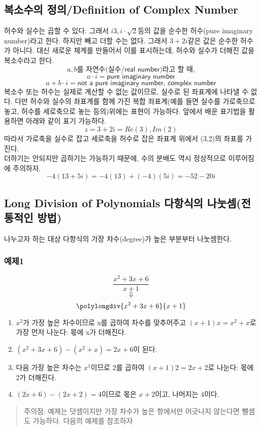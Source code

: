 \documentclass{article}
\begin{document}
\subsection{복소수의 정의/Definition of Complex Number}
허수와 실수는 곱할 수 있다. 그래서 $i3, i\cdot \sqrt{2}$등의 값을 순수한 허수(pure imaginary number)라고 한다. 하지만 빼고 더할 수는 없다. 그래서 $3+2i$같은 값은 순수한 허수가 아니다. 대신 새로운 체계를 만들어서 이를 표시하는데, 허수와 실수가 더해진 값을 복소수라고 한다.
$$a,b{\textsf{를 자연수(실수/real number)라고 할 때,}}$$
$$a\cdot i = {\textsf{pure imaginary number}}$$
$$a+b\cdot i = {\textsf{not a pure imaginary number, complex number}}$$
복소수 또는 허수는 실제로 계산할 수 없는 값이므로, 실수로 된 좌표계에 나타낼 수 없다. 다만 허수와 실수의 좌표계를 함께 가진 복합 좌표계(예를 들면 실수를 가로축으로 놓고, 허수를 세로축으로 놓는 등의)위에는 표현이 가능하다. 앞에서 배운 표기법을 활용하면 아래와 같이 표기 가능하다.
$$z=3+2i = Re(3), Im(2)$$
따라서 가로축을 실수로 잡고 세로축을 허수로 잡은 좌표계 위에서 (3,2)의 좌표를 가진다. \\ 더하기는 안되지만 곱하기는 가능하기 때문에, 수의 분배도 역시 정상적으로 이루어짐에 주의하자.
$$-4(13+5i)=-4(13)+(-4)(5i)=-52-20i$$

\subsection{Long Division of Polynomials 다항식의 나눗셈(전통적인 방법)}
나누고자 하는 대상 다항식의 가장 차수(degree)가 높은 부분부터 나눗셈한다.
\subsubsection{예제1}
$$\frac{x^{2}+3x+6}{x+1}$$
$$\Downarrow$$
$$\polylongdiv{x^{2}+3x+6}{x+1}$$
\begin{enumerate}
\item $x^{2}$가 가장 높은 차수이므로 x를 곱하여 차수를 맞추어주고 $(x+1)x = x^{2}+x$로 가장 먼저 나눈다: 몫에 x가 더해진다.
\item $(x^{2}+3x+6)-(x^{2}+x)=2x+6$이 된다.
\item 다음 가장 높은 차수는 $x^{1}$이므로 2를 곱하여 $(x+1)2 = 2x+2$로 나눈다: 몫에 2가 더해진다.
\item $(2x+6)-(2x+2) = 4$이므로 몫은 $x+2$이고, 나머지는 $4$이다.
\end{enumerate}
\begin{quote}
주의점: 예제는 덧셈이지만 가장 차수가 높은 항에서만 어긋나지 않는다면 뺄셈도 가능하다. 다음의 예제를 참조하자
\end{quote}
\end{document}
